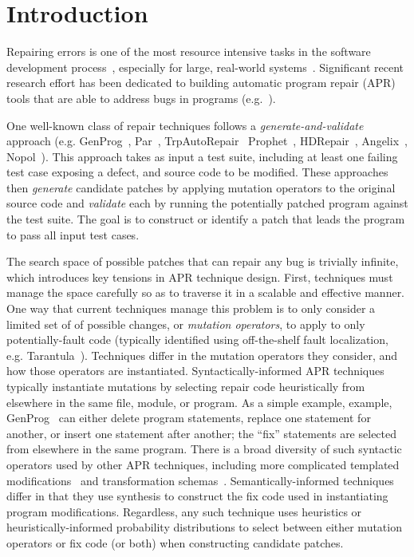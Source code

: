 \documentclass[conference]{IEEEtran}
\begin{document}
\section{Introduction} \label{introduction}
Repairing errors is one of the most 
resource intensive tasks in 
the software development process~\cite{Weiss07,Tassey02,Britton13}, especially for large, real-world systems~\cite{Liblit03,Anvik05}.
%
Significant recent research effort has been dedicated to
building automatic program repair (APR) tools that are able to address
bugs in 
programs (e.g.~\cite{legoues12,kim2013,Weimer13,fan15SPR,long16proph,debroy10,perkins09,wei10}).

One well-known class of repair techniques follows a 
\emph{generate-and-validate} approach  (e.g. GenProg~\cite{legoues12}, 
Par~\cite{kim2013}, TrpAutoRepair~\cite{Qi13TrpAutoR}
Prophet~\cite{long16proph}, HDRepair~\cite{xuan16}, Angelix~\cite{angelix},
Nopol~\cite{nopol}).  This approach takes as input a test suite, 
including at
least one failing test case exposing
a defect, and source code to be 
modified.  These approaches then \emph{generate} candidate patches
by applying 
mutation operators to the original source code and \emph{validate} each by
running the potentially patched program against the test suite.  The goal is to
construct or identify a patch that
leads the program to pass all input test cases. 

The search space of possible patches that can repair any bug is trivially
infinite, which introduces key tensions in APR
technique design.  First, 
techniques must manage the space carefully so as to traverse it in a scalable and
effective manner.  One way that current techniques manage this problem is to
only consider a limited set of of possible changes, or \emph{mutation operators}, 
to apply to only potentially-fault code (typically identified using off-the-shelf fault 
localization, e.g. Tarantula~\cite{Jones02}).  
Techniques differ in the mutation operators they consider, and how those operators
are instantiated.  Syntactically-informed APR techniques typically instantiate
mutations by selecting repair code heuristically from elsewhere in the same
file, module, or program.  As a simple example, example, GenProg~\cite{legoues12} can either
delete program statements, replace one statement for another, or insert one
statement after another; the ``fix'' statements are selected from elsewhere in
the same program.  There is a broad diversity of such syntactic operators used
by other APR techniques, including more complicated templated modifications~\cite{kim2013} and transformation 
schemas~\cite{long16proph,long15SPR}.  Semantically-informed
techniques~\cite{semfix,angelix,nopol} differ in that they use synthesis to
construct the fix code used in instantiating program modifications.  
Regardless, any such technique uses heuristics or heuristically-informed
probability distributions to select between either mutation operators or fix
code (or both) when constructing candidate patches. 
\end{document}
